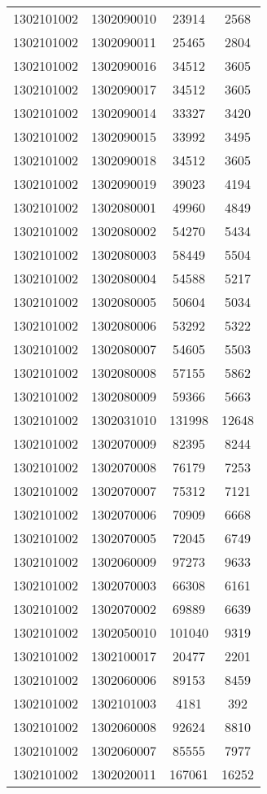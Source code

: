 \begin{longtable}{llcc}
1302101002 & 1302090010 & 23914 & 2568\\
1302101002 & 1302090011 & 25465 & 2804\\
1302101002 & 1302090016 & 34512 & 3605\\
1302101002 & 1302090017 & 34512 & 3605\\
1302101002 & 1302090014 & 33327 & 3420\\
1302101002 & 1302090015 & 33992 & 3495\\
1302101002 & 1302090018 & 34512 & 3605\\
1302101002 & 1302090019 & 39023 & 4194\\
1302101002 & 1302080001 & 49960 & 4849\\
1302101002 & 1302080002 & 54270 & 5434\\
1302101002 & 1302080003 & 58449 & 5504\\
1302101002 & 1302080004 & 54588 & 5217\\
1302101002 & 1302080005 & 50604 & 5034\\
1302101002 & 1302080006 & 53292 & 5322\\
1302101002 & 1302080007 & 54605 & 5503\\
1302101002 & 1302080008 & 57155 & 5862\\
1302101002 & 1302080009 & 59366 & 5663\\
1302101002 & 1302031010 & 131998 & 12648\\
1302101002 & 1302070009 & 82395 & 8244\\
1302101002 & 1302070008 & 76179 & 7253\\
1302101002 & 1302070007 & 75312 & 7121\\
1302101002 & 1302070006 & 70909 & 6668\\
1302101002 & 1302070005 & 72045 & 6749\\
1302101002 & 1302060009 & 97273 & 9633\\
1302101002 & 1302070003 & 66308 & 6161\\
1302101002 & 1302070002 & 69889 & 6639\\
1302101002 & 1302050010 & 101040 & 9319\\
1302101002 & 1302100017 & 20477 & 2201\\
1302101002 & 1302060006 & 89153 & 8459\\
1302101002 & 1302101003 & 4181 & 392\\
1302101002 & 1302060008 & 92624 & 8810\\
1302101002 & 1302060007 & 85555 & 7977\\
1302101002 & 1302020011 & 167061 & 16252\\

\end{longtable}
